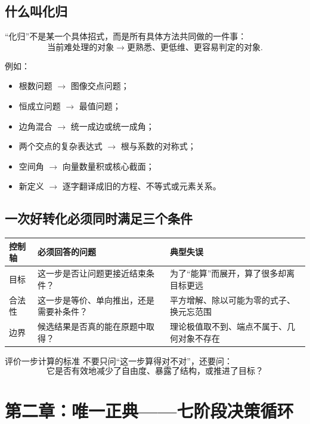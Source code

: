 \documentclass[11pt,a4paper]{ctexart}
\begin{document}
\subsection{什么叫化归}

“化归”不是某一个具体招式，而是所有具体方法共同做的一件事：
\[
\text{当前难处理的对象}
\longrightarrow
\text{更熟悉、更低维、更容易判定的对象}.
\]

例如：
\begin{itemize}
  \item 根数问题 $\rightarrow$ 图像交点问题；
  \item 恒成立问题 $\rightarrow$ 最值问题；
  \item 边角混合 $\rightarrow$ 统一成边或统一成角；
  \item 两个交点的复杂表达式 $\rightarrow$ 根与系数的对称式；
  \item 空间角 $\rightarrow$ 向量数量积或核心截面；
  \item 新定义 $\rightarrow$ 逐字翻译成旧的方程、不等式或元素关系。
\end{itemize}

\subsection{一次好转化必须同时满足三个条件}

\begin{longtable}{p{2.2cm}p{5.2cm}p{7.2cm}}
\toprule
\textbf{控制轴} & \textbf{必须回答的问题} & \textbf{典型失误}\\
\midrule
目标 & 这一步是否让问题更接近结束条件？ & 为了“能算”而展开，算了很多却离目标更远\\ \hline
合法性 & 这一步是等价、单向推出，还是需要补条件？ & 平方增解、除以可能为零的式子、换元忘范围\\ \hline
边界 & 候选结果是否真的能在原题中取得？ & 理论极值取不到、端点不属于、几何对象不存在\\
\bottomrule
\end{longtable}

\begin{corebox}{评价一步计算的标准}
不要只问“这一步算得对不对”，还要问：
\[
\boxed{\text{它是否有效地减少了自由度、暴露了结构，或推进了目标？}}
\]
\end{corebox}

\section{第二章：唯一正典——七阶段决策循环}
\end{document}
